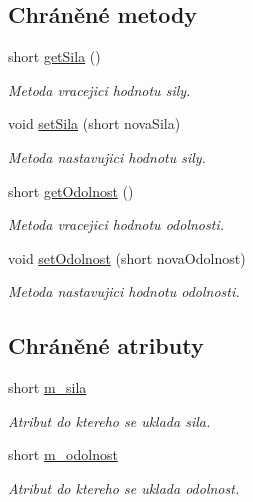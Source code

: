 \subsection*{Chráněné metody}
\begin{DoxyCompactItemize}
\item 
short \hyperlink{classIceAge_1_1Staty_a2c8b38d3cfa305f5b5fab199894dd922}{get\+Sila} ()
\begin{DoxyCompactList}\small\item\em Metoda vracejici hodnotu sily. \end{DoxyCompactList}\item 
void \hyperlink{classIceAge_1_1Staty_a769be7c06fd2ab2bc7057f2689e6864c}{set\+Sila} (short nova\+Sila)
\begin{DoxyCompactList}\small\item\em Metoda nastavujici hodnotu sily. \end{DoxyCompactList}\item 
short \hyperlink{classIceAge_1_1Staty_a142a0ec049584c8ea716b96d2b742b08}{get\+Odolnost} ()
\begin{DoxyCompactList}\small\item\em Metoda vracejici hodnotu odolnosti. \end{DoxyCompactList}\item 
void \hyperlink{classIceAge_1_1Staty_a14cd86c6d0d4ed7585ff5383aea5e6ef}{set\+Odolnost} (short nova\+Odolnost)
\begin{DoxyCompactList}\small\item\em Metoda nastavujici hodnotu odolnosti. \end{DoxyCompactList}\end{DoxyCompactItemize}
\subsection*{Chráněné atributy}
\begin{DoxyCompactItemize}
\item 
short \hyperlink{classIceAge_1_1Staty_a9ff580be9af5b83c9a26cbb031a39cce}{m\+\_\+sila}
\begin{DoxyCompactList}\small\item\em Atribut do ktereho se uklada sila. \end{DoxyCompactList}\item 
short \hyperlink{classIceAge_1_1Staty_a71017d01cdc77192c6f70946b25a74e8}{m\+\_\+odolnost}
\begin{DoxyCompactList}\small\item\em Atribut do ktereho se uklada odolnost. \end{DoxyCompactList}\end{DoxyCompactItemize}


